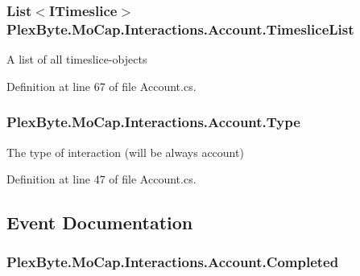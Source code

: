 \subsubsection[{\texorpdfstring{Timeslice\+List}{TimesliceList}}]{\setlength{\rightskip}{0pt plus 5cm}List$<${\bf I\+Timeslice}$>$ Plex\+Byte.\+Mo\+Cap.\+Interactions.\+Account.\+Timeslice\+List\hspace{0.3cm}{\ttfamily [get]}}\hypertarget{class_plex_byte_1_1_mo_cap_1_1_interactions_1_1_account_a0a45c7a5a420fde27cfc1c008a7023f1}{}\label{class_plex_byte_1_1_mo_cap_1_1_interactions_1_1_account_a0a45c7a5a420fde27cfc1c008a7023f1}


A list of all timeslice-\/objects 



Definition at line 67 of file Account.\+cs.

\subsubsection[{\texorpdfstring{Type}{Type}}]{ Plex\+Byte.\+Mo\+Cap.\+Interactions.\+Account.\+Type\hspace{0.3cm}{\ttfamily [get]}}\hypertarget{class_plex_byte_1_1_mo_cap_1_1_interactions_1_1_account_ab8c590e09224e5015e66019cec50280c}{}\label{class_plex_byte_1_1_mo_cap_1_1_interactions_1_1_account_ab8c590e09224e5015e66019cec50280c}


The type of interaction (will be always account) 



Definition at line 47 of file Account.\+cs.



\subsection{Event Documentation}
\subsubsection[{\texorpdfstring{Completed}{Completed}}]{ Plex\+Byte.\+Mo\+Cap.\+Interactions.\+Account.\+Completed}\hypertarget{class_plex_byte_1_1_mo_cap_1_1_interactions_1_1_account_a2d975974095e091d66e21cfa2d28b9ab}{}\label{class_plex_byte_1_1_mo_cap_1_1_interactions_1_1_account_a2d975974095e091d66e21cfa2d28b9ab}



